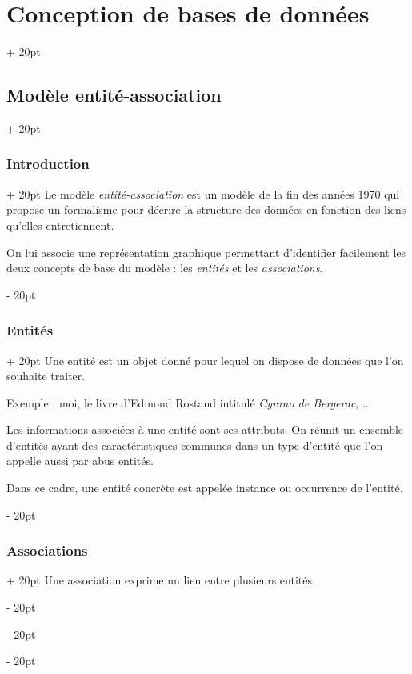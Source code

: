 \documentclass[a4paper, 12pt, twoside]{article}
\newcommand{\ind}[1][20pt]{\advance\leftskip + #1}
\newcommand{\deind}[1][20pt]{\advance\leftskip - #1}
\newenvironment{indt}[2][20pt]{#2 \par \ind[#1]}{\par \deind} %
\begin{document}
    \begin{indt}{\section{Conception de bases de données}}
        \begin{indt}{\subsection{Modèle entité-association}}
            \begin{indt}{\subsubsection{Introduction}}
                Le modèle \textit{entité-association}  est un modèle de la fin des années 1970 qui propose un formalisme pour décrire la structure des données en fonction des liens qu'elles entretiennent.

                On lui associe une représentation graphique permettant d'identifier facilement les deux concepts de base du modèle : les \textit{entités} et les \textit{associations}.
            \end{indt}

            \vspace{12pt}
            
            \begin{indt}{\subsubsection{Entités}}
                Une entité est un objet donné pour lequel on dispose de données que l'on souhaite traiter.

                Exemple : moi, le livre d'Edmond Rostand intitulé \textit{Cyrano de Bergerac}, $\ldots$ 

                Les informations associées à une entité sont ses attributs. On réunit un ensemble d'entités ayant des caractéristiques communes dans un type d'entité que l'on appelle aussi par abus entités.

                Dans ce cadre, une entité concrète est appelée instance ou occurrence de l'entité.
            \end{indt}

            \vspace{12pt}
            
            \begin{indt}{\subsubsection{Associations}}
                Une association exprime un lien entre plusieurs entités.


\end{indt}
\end{indt}
\end{indt}
\end{document}
